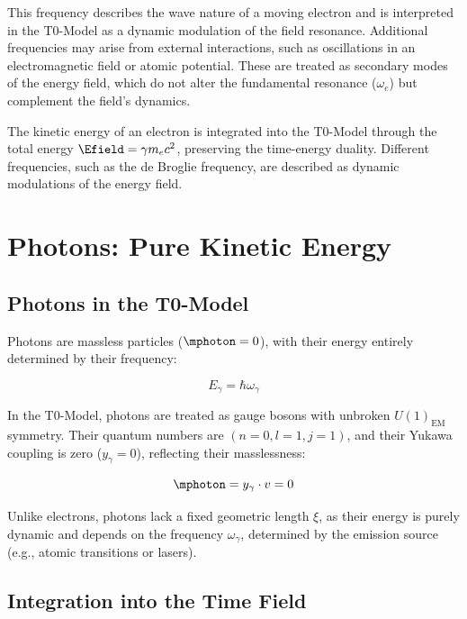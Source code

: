 This frequency describes the wave nature of a moving electron and is interpreted in the T0-Model as a dynamic modulation of the field resonance. Additional frequencies may arise from external interactions, such as oscillations in an electromagnetic field or atomic potential. These are treated as secondary modes of the energy field, which do not alter the fundamental resonance (\(\omega_e\)) but complement the field's dynamics.

\begin{important}
	The kinetic energy of an electron is integrated into the T0-Model through the total energy \( \Efield = \gamma m_e c^2 \), preserving the time-energy duality. Different frequencies, such as the de Broglie frequency, are described as dynamic modulations of the energy field.
\end{important}

\section{Photons: Pure Kinetic Energy}
\label{sec:photon_energy}

\subsection{Photons in the T0-Model}
\label{subsec:photon_model}

Photons are massless particles (\( \mphoton = 0 \)), with their energy entirely determined by their frequency:

\begin{equation}
	E_\gamma = \hbar \omega_\gamma
\end{equation}

In the T0-Model, photons are treated as gauge bosons with unbroken \( U(1)_{\text{EM}} \) symmetry. Their quantum numbers are \((n=0, l=1, j=1)\), and their Yukawa coupling is zero (\( y_\gamma = 0 \)), reflecting their masslessness:

\begin{equation}
	\mphoton = y_\gamma \cdot v = 0
\end{equation}

Unlike electrons, photons lack a fixed geometric length \(\xi\), as their energy is purely dynamic and depends on the frequency \(\omega_\gamma\), determined by the emission source (e.g., atomic transitions or lasers).

\subsection{Integration into the Time Field}
\label{subsec:photon_time_field}

